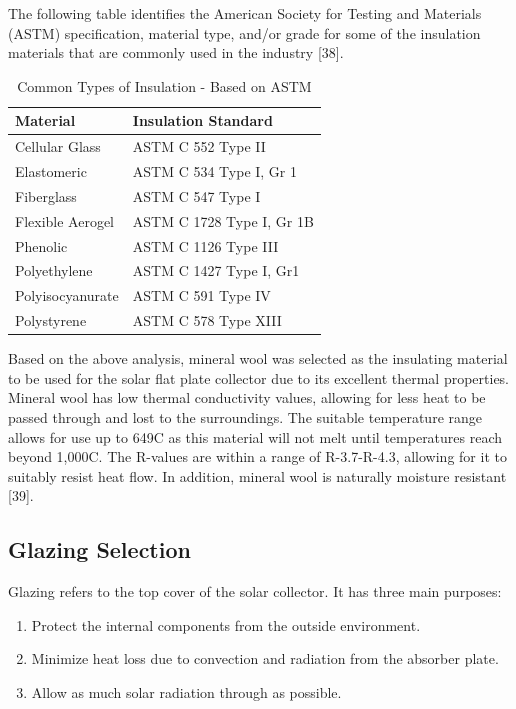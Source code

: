 \medskip
The following table identifies the American Society for Testing and Materials (ASTM) specification, material type, and/or grade for some of the insulation materials that are commonly used in the industry [38].

\medskip
\begin{table}[H]
\centering
\caption{Common Types of Insulation - Based on ASTM}
\begin{tabular}{|P{50mm}|P{50mm}|}
    \hline
    Material & Insulation Standard \\
    \hline
    Cellular Glass   & ASTM C 552 Type II        \\
    Elastomeric      & ASTM C 534 Type I, Gr 1   \\
    Fiberglass       & ASTM C 547 Type I         \\
    Flexible Aerogel & ASTM C 1728 Type I, Gr 1B \\
    Phenolic         & ASTM C 1126 Type III      \\
    Polyethylene     & ASTM C 1427 Type I, Gr1   \\
    Polyisocyanurate & ASTM C 591 Type IV        \\
    Polystyrene      & ASTM C 578 Type XIII      \\
    \hline
\end{tabular}
\end{table}

\medskip
Based on the above analysis, mineral wool was selected as the insulating material to be used for the solar flat plate collector due to its excellent thermal properties. Mineral wool has low thermal conductivity values, allowing for less heat to be passed through and lost to the surroundings. The suitable temperature range allows for use up to 649\textdegree C as this material will not melt until temperatures reach beyond 1,000\textdegree C. The R-values are within a range of R-3.7-R-4.3, allowing for it to suitably resist heat flow. In addition, mineral wool is naturally moisture resistant [39].

\newpage
\subsection{Glazing Selection}

Glazing refers to the top cover of the solar collector. It has three main purposes:

\medskip
\begin{enumerate}[itemsep=3mm, parsep=-1mm, label=\roman*.]
    \item Protect the internal components from the outside environment.
    \item Minimize heat loss due to convection and radiation from the absorber plate.
    \item Allow as much solar radiation through as possible.
\end{enumerate}

